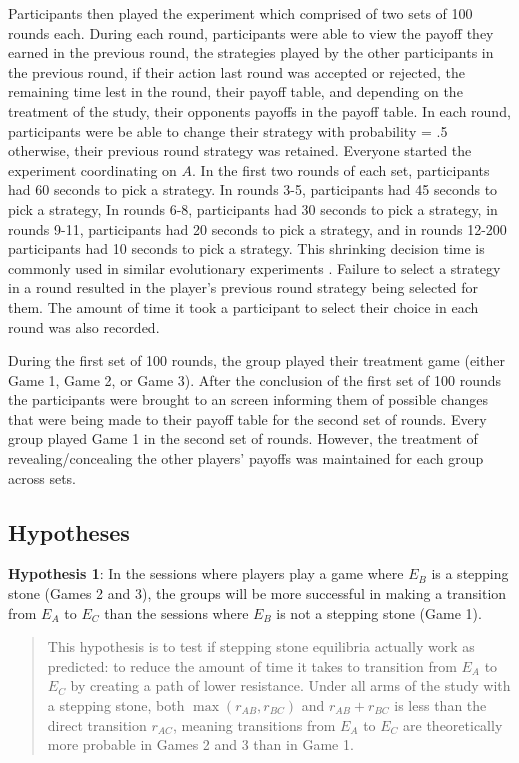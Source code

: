 Participants then played the experiment which comprised of two sets of 100 rounds each. During each round, participants were able to view the payoff they earned in the previous round, the strategies played by the other participants in the previous round, if their action last round was accepted or rejected, the remaining time lest in the round, their payoff table, and depending on the treatment of the study, their opponents payoffs in the payoff table. In each round, participants were be able to change their strategy with probability = .5 otherwise, their previous round strategy was retained. Everyone started the experiment coordinating on $A$.
In the first two rounds of each set, participants had 60 seconds to pick a strategy. In rounds 3-5, participants had 45 seconds to pick a strategy, In rounds 6-8, participants had 30 seconds to pick a strategy, in rounds 9-11, participants had 20 seconds to pick a strategy, and in rounds 12-200 participants had 10 seconds to pick a strategy. This shrinking decision time is commonly used in similar evolutionary experiments \citep{lim2016experimental, hwang2018conventional}. Failure to select a strategy in a round resulted in the player's previous round strategy being selected for them. The amount of time it took a participant to select their choice in each round was also recorded.

During the first set of 100 rounds, the group played their treatment game (either Game 1, Game 2, or Game 3). After the conclusion of the first set of 100 rounds the participants were brought to an screen informing them of possible changes that were being made to their payoff table for the second set of rounds. Every group played Game 1 in the second set of rounds. However, the treatment of revealing/concealing the other players' payoffs was maintained for each group across sets. 

\subsection{Hypotheses}

\vskip12pt
\textbf{Hypothesis 1}: In the sessions where players play a game where $E_B$ is a stepping stone (Games 2 and 3), the groups will be more successful in making a transition from $E_A$ to $E_C$ than the sessions where $E_B$ is not a stepping stone (Game 1).
\vskip6pt
\begin{quote}
This hypothesis is to test if stepping stone equilibria actually work as predicted: to reduce the amount of time it takes to transition from $E_A$ to $E_C$ by creating a path of lower resistance. Under all arms of the study with a stepping stone, both $\max(r_{AB}, r_{BC})$ and $r_{AB}+r_{BC}$ is less than the direct transition $r_{AC}$, meaning transitions from $E_A$ to $E_C$ are theoretically more probable in Games 2 and 3 than in Game 1.
\end{quote}

